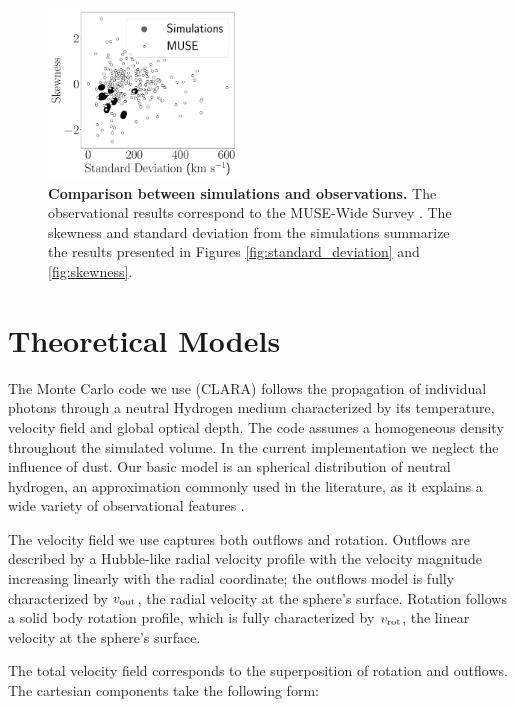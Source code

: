 \documentclass[a4paper,fleqn,usenatbib]{mnras}
\begin{document}
\begin{figure}
\centering
\includegraphics[width=0.45\textwidth]{muse_vs_simulations.pdf}

\caption{\textbf{Comparison between simulations and observations.}  
The observational results correspond to the MUSE-Wide Survey
\citep{2017A&A...606A..12H}. The skewness and standard deviation from
the simulations summarize the results presented in Figures
\ref{fig:standard_deviation} and \ref{fig:skewness}.
  \label{fig:muse}}
\end{figure}


\section{Theoretical Models}
\label{sec:theory}


The Monte Carlo code we use (CLARA) \citep{CLARA} follows the propagation of
individual photons through a neutral Hydrogen medium characterized by
its temperature, velocity field and global optical depth.
The code assumes a homogeneous density throughout the simulated
volume.
In the current implementation we neglect the influence of dust.
Our basic model is an spherical distribution of neutral hydrogen,
an approximation commonly used in the literature, as it explains a
wide variety of observational features
\citep{Ahn03,Verhamme06,Dijkstra06}. 


The velocity field we use captures both outflows and rotation.
Outflows are described by a Hubble-like radial velocity profile with
the velocity magnitude increasing linearly with the radial
coordinate; the outflows model is fully characterized by $v_{\rm out}$, the
radial velocity at the sphere's surface.
Rotation follows a solid body rotation profile, which is fully
characterized by $v_{\rm rot}$, the linear velocity at the sphere's surface.

The total velocity field corresponds to the superposition of rotation and
outflows.
The cartesian components take the following form:
\end{document}
